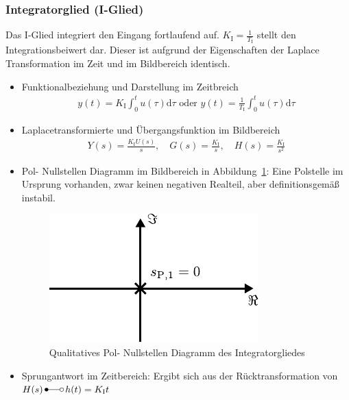 \subsubsection{Integratorglied (I-Glied)}
%
Das I-Glied integriert den Eingang fortlaufend auf. $K_{\text{I}}=\frac{1}{T_{\text{I}}}$ stellt den Integrationsbeiwert dar. Dieser ist aufgrund der Eigenschaften der Laplace Transformation im Zeit und im Bildbereich identisch.
%
\begin{itemize}
	\item Funktionalbeziehung und Darstellung im Zeitbreich
	\begin{equation*}
	\begin{aligned}
	y(t)=K_{\text{I}}\int_{0}^{t}u(\tau)\text{d}\tau \,\,\text{oder}\,\, y(t)=\frac{1}{T_{\text{I}}}\int_{0}^{t}u(\tau)\text{d}\tau
	\end{aligned}
	\end{equation*}
	\item Laplacetransformierte und Übergangsfunktion im Bildbereich
	\begin{equation*}
	\begin{aligned}
	Y(s)=\frac{K_{\text{I}}U(s)}{s},\quad G(s)=\frac{K_{\text{I}}}{s},\quad H(s)=\frac{K_{\text{I}}}{s^{2}}
	\end{aligned}
	\end{equation*}
	\item Pol- Nullstellen Diagramm im Bildbereich in Abbildung~\ref{fig:igliedpn}: Eine Polstelle im Ursprung vorhanden, zwar keinen negativen Realteil, aber definitionsgemäß instabil. 
	\begin{figure}[h]
		\centering
		\includegraphics[width=0.4\linewidth]{Abbildungen/Modellbildung/PDF/Igliedpn.pdf}
		\caption{Qualitatives Pol- Nullstellen Diagramm des Integratorgliedes}
		\label{fig:igliedpn}
	\end{figure}
	\item Sprungantwort im Zeitbereich: Ergibt sich aus der Rücktransformation von \\$H(s) \,\Laplace\, h(t)=K_{\text{I}}t$
	\begin{figure}[h]

\end{figure}
\end{itemize}
